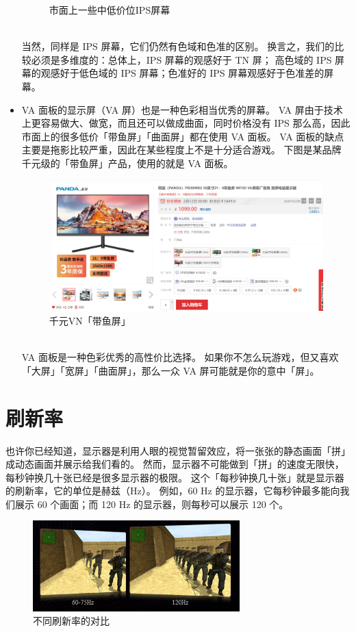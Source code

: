\begin{itemize}
\begin{figure}[htb!]
      \caption{市面上一些中低价位IPS屏幕}
      \label{IPS_at_Low_Price}
    \end{figure}\\
    当然，同样是 IPS 屏幕，它们仍然有色域和色准的区别。
    换言之，我们的比较必须是多维度的：总体上，IPS 屏幕的观感好于 TN 屏；
    高色域的 IPS 屏幕的观感好于低色域的 IPS 屏幕；色准好的 IPS 屏幕观感好于色准差的屏幕。
  \item VA 面板的显示屏（VA 屏）也是一种色彩相当优秀的屏幕。
    VA 屏由于技术上更容易做大、做宽，而且还可以做成曲面，同时价格没有 IPS 那么高，因此市面上的很多低价「带鱼屏」「曲面屏」都在使用 VA 面板。
    VA 面板的缺点主要是拖影比较严重，因此在某些程度上不是十分适合游戏。
    下图是某品牌千元级的「带鱼屏」产品，使用的就是 VA 面板。
    \begin{figure}[htb!]
      \centering
      \includegraphics[width=11cm]{assets/VN_at_Low_Price.png}
      \caption{千元VN「带鱼屏」}
      \label{VN_at_Low_Price}
    \end{figure}\\
    VA 面板是一种色彩优秀的高性价比选择。
    如果你不怎么玩游戏，但又喜欢「大屏」「宽屏」「曲面屏」，那么一众 VA 屏可能就是你的意中「屏」。
\end{itemize}

\section{刷新率}

也许你已经知道，显示器是利用人眼的视觉暂留效应，将一张张的静态画面「拼」成动态画面并展示给我们看的。
然而，显示器不可能做到「拼」的速度无限快，每秒钟换几十张已经是很多显示器的极限。
这个「每秒钟换几十张」就是显示器的刷新率，它的单位是赫兹（Hz）。
例如，60 Hz 的显示器，它每秒钟最多能向我们展示 60 个画面；而 120 Hz 的显示器，则每秒可以展示 120 个。

\begin{figure}[htb!]
  \centering
  \includegraphics[width=8cm]{assets/60Hz_vs_120Hz.png}
  \caption{不同刷新率的对比}
  \label{60Hz_vs_120Hz}
\end{figure}

